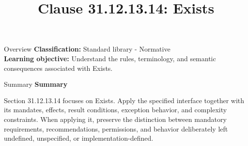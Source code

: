\documentclass[10pt,letterpaper]{article}
\title{Clause 31.12.13.14: Exists}
\author{}
\date{}
\begin{document}
\maketitle
\begin{CornellOverviewBox}{Overview}
\textbf{Classification:} Standard library - Normative\\[2pt]
\textbf{Learning objective:} Understand the rules, terminology, and semantic consequences associated with Exists.
\end{CornellOverviewBox}\begin{CornellSummaryBox}{Summary}
{\sffamily\bfseries\color{Accent} Summary}\par\vspace{3pt}Section 31.12.13.14 focuses on Exists. Apply the specified interface together with its mandates, effects, result conditions, exception behavior, and complexity constraints. When applying it, preserve the distinction between mandatory requirements, recommendations, permissions, and behavior deliberately left undefined, unspecified, or implementation-defined.
\end{CornellSummaryBox}
\end{document}
